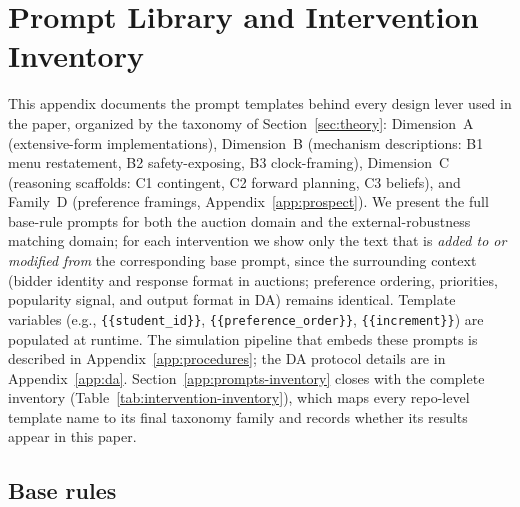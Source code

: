 \section{Prompt Library and Intervention Inventory}\label{app:prompts}

This appendix documents the prompt templates behind every design lever used in the paper, organized by the taxonomy of Section~\ref{sec:theory}: Dimension~A (extensive-form implementations), Dimension~B (mechanism descriptions: B1 menu restatement, B2 safety-exposing, B3 clock-framing), Dimension~C (reasoning scaffolds: C1 contingent, C2 forward planning, C3 beliefs), and Family~D (preference framings, Appendix~\ref{app:prospect}). We present the full base-rule prompts for both the auction domain and the external-robustness matching domain; for each intervention we show only the text that is \emph{added to or modified from} the corresponding base prompt, since the surrounding context (bidder identity and response format in auctions; preference ordering, priorities, popularity signal, and output format in DA) remains identical. Template variables (e.g., \texttt{\{\{student\_id\}\}}, \texttt{\{\{preference\_order\}\}}, \texttt{\{\{increment\}\}}) are populated at runtime. The simulation pipeline that embeds these prompts is described in Appendix~\ref{app:procedures}; the DA protocol details are in Appendix~\ref{app:da}. Section~\ref{app:prompts-inventory} closes with the complete inventory (Table~\ref{tab:intervention-inventory}), which maps every repo-level template name to its final taxonomy family and records whether its results appear in this paper.

\subsection{Base rules}\label{app:prompts-base}

